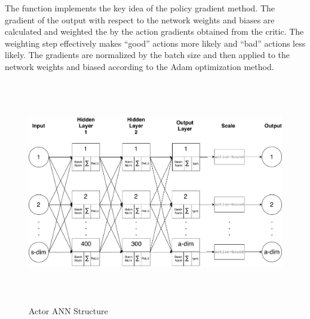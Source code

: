 The  function implements the key idea of the policy gradient method. The gradient of the output with respect to the network weights and biases are calculated and weighted the by the action gradients obtained from the critic. The weighting step effectively makes ``good'' actions more likely and ``bad'' actions less likely. The gradients are normalized by the batch size and then applied to the network weights and biased according to the Adam optimization method. 
\begin{figure}[H]   %
	\centering \includegraphics[width=6in, height=3.85in, keepaspectratio]{figures/actor_net.pdf}
	\caption{Actor ANN Structure}\label{fig:actor_net}
\end{figure}
\newpage
